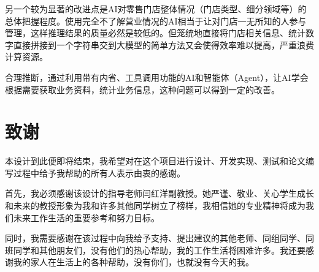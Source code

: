 另一个较为显著的改进点是AI对零售门店整体情况（门店类型、细分领域等）的总体把握程度。使用完全不了解营业情况的AI相当于让对门店一无所知的人参与管理，这样推理结果的质量必然是较低的。但笼统地直接将门店相关信息、统计数字直接拼接到一个字符串交到大模型的简单方法又会使得效率难以提高，严重浪费计算资源。

合理推断，通过利用带有内省、工具调用功能的AI和智能体（Agent），让AI学会根据需要获取业务资料，统计业务信息，这种问题可以得到一定的改善。

\printbibliography[heading=bibintoc]

\section*{致谢}

本设计到此便即将结束，我希望对在这个项目进行设计、开发实现、测试和论文编写过程中给予我帮助的所有人表示由衷的感谢。

首先，我必须感谢该设计的指导老师闫红洋副教授。她严谨、敬业、关心学生成长和未来的教授形象为我和许多其他同学树立了榜样，我相信她的专业精神将成为我们未来工作生活的重要参考和努力目标。

同时，我需要感谢在该过程中向我给予支持、提出建议的其他老师、同组同学、同班同学和其他朋友们，没有他们的热心帮助，我的工作生活将困难许多。我还要感谢我的家人在生活上的各种帮助，没有你们，也就没有今天的我。